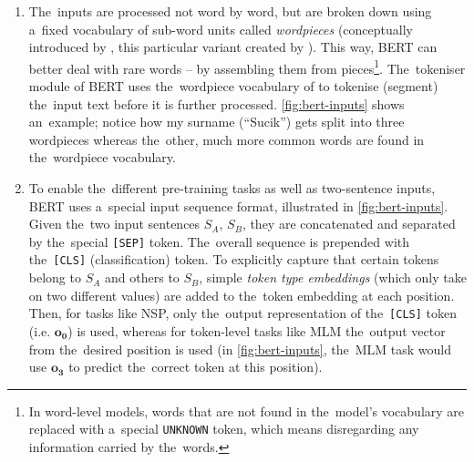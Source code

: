 \documentclass[bsc,frontabs,singlespacing,parskip,deptreport]{infthesis}
\begin{document}
{{{\begin{enumerate}
{\begin{enumerate}
          \item The~\textit{next-sentence prediction} (NSP) task encourages BERT to learn good sentence-level representations. Given two sentences, the~task is to predict whether they formed a~consecutive sentence pair in the~text they came from, or not.
        \end{enumerate}
        The~pre-training was carried out on text from books and from the~English Wikipedia, totalling to 3,400 million words (for details see \citet{Devlin_2018}). The~MLM and NSP tasks were both used throughout the~pre-training, forcing the~model to learn both at the~same time.
        }
        \item The~inputs are processed not word by word, but are broken down using a~fixed vocabulary of sub-word units called \textit{wordpieces} (conceptually introduced by \citet{Sennrich_2016}, this particular variant created by \citet{Wu_2016}). This way, BERT can better deal with rare words -- by assembling them from pieces\footnote{In word-level models, words that are not found in the~model's vocabulary are replaced with a~special \verb|UNKNOWN| token, which means disregarding any information carried by the~words.}. The~tokeniser module of BERT uses the~wordpiece vocabulary of \citeauthor{Wu_2016} to tokenise (segment) the~input text before it is further processed. \autoref{fig:bert-inputs} shows an~example; notice how my surname (``Sucik'') gets split into three wordpieces whereas the~other, much more common words are found in the~wordpiece vocabulary.
        \item To enable the~different pre-training tasks as well as two-sentence inputs, BERT uses a~special input sequence format, illustrated in \autoref{fig:bert-inputs}. Given the~two input sentences $S_A$, $S_B$, they are concatenated and separated by the~special \verb|[SEP]| token. The~overall sequence is prepended with the~\verb|[CLS]| (classification) token. To explicitly capture that certain tokens belong to $S_A$ and others to $S_B$, simple \textit{token type embeddings} (which only take on two different values) are added to the~token embedding at each position. Then, for tasks like NSP, only the~output representation of the~\verb|[CLS]| token (i.e. $\bm{o_0}$) is used, whereas for token-level tasks like MLM the~output vector from the~desired position is used (in \autoref{fig:bert-inputs}, the~MLM task would use $\bm{o_3}$ to predict the~correct token at this position).
      \end{enumerate}

}}}
\end{document}
